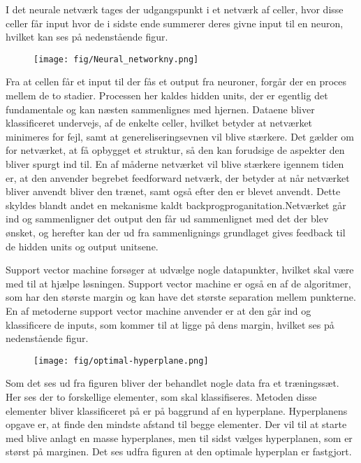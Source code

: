 I det neurale netværk tages der udgangspunkt i et netværk af celler, hvor disse celler får input hvor de i sidste ende summerer deres givne input til en neuron, hvilket kan ses på nedenstående figur.
\begin{figure}[H]	
\centering
\texttt{[image: fig/Neural\_networkny.png]}
\caption{ }
\label{fig:Neural netvaerk}
\end{figure}
Fra at cellen får et input til der fås et output fra neuroner, forgår der en proces mellem de to stadier. Processen her kaldes hidden units, der er egentlig det fundamentale og kan næsten sammenlignes med hjernen. Dataene bliver klassificeret undervejs, af de enkelte celler, hvilket betyder at netværket minimeres for fejl, samt at genereliseringsevnen vil blive stærkere. Det gælder om for netværket, at få opbygget et struktur, så den kan forudsige de aspekter den bliver spurgt ind til. \cite{DIKU2010} En af måderne netværket vil blive stærkere igennem tiden er, at den anvender begrebet feedforward netværk, der betyder at når netværket bliver anvendt bliver den trænet, samt også efter den er blevet anvendt. Dette skyldes blandt andet en mekanisme kaldt backprogproganitation.Netværket går ind og sammenligner det output den får ud sammenlignet med det der blev ønsket, og herefter kan der ud fra sammenlignings grundlaget gives feedback til de hidden units og output unitsene. \cite{Luo2016} 

Support vector machine forsøger at udvælge nogle datapunkter, hvilket skal være med til at hjælpe løsningen. Support vector machine er også en af de algoritmer, som har den største margin og kan have det største separation mellem punkterne. En af metoderne support vector machine anvender er at den går ind og klassificere de inputs, som kommer til at ligge på dens margin, hvilket ses på nedenstående figur. 

\begin{figure}[H]	
\centering
\texttt{[image: fig/optimal-hyperplane.png]}
\caption{ }
\label{fig:Klassifikation af inputs}
\end{figure}  

Som det ses ud fra figuren bliver der behandlet nogle data fra et træningssæt. Her ses der to forskellige elementer, som skal klassifiseres. Metoden disse elementer bliver klassificeret på er på baggrund af en hyperplane. Hyperplanens opgave er, at finde den mindste afstand til begge elementer. Der vil til at starte med blive anlagt en masse hyperplanes, men til sidst vælges hyperplanen, som er størst på marginen. Det ses udfra figuren at den optimale hyperplan er fastgjort. \cite{Shai2014} 




